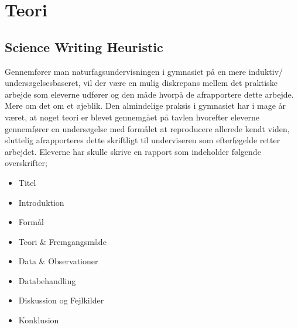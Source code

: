 \section{Teori}
\label{sec:2.5}

\subsection*{Science Writing Heuristic}
Gennemfører man naturfagsundervisningen i gymnasiet på en mere induktiv/ undersøgelsesbaseret, vil der være en mulig diskrepans mellem det praktiske arbejde som eleverne udfører og den måde hvorpå de afrapportere dette arbejde. Mere om det om et øjeblik. Den almindelige praksis i gymnasiet har i mage år været, at noget teori er blevet gennemgået på tavlen hvorefter eleverne gennemfører en undersøgelse med formålet at reproducere allerede kendt viden, sluttelig afrapporteres dette skriftligt til underviseren som efterføgelde retter arbejdet. Eleverne har skulle skrive en rapport som indeholder følgende overskrifter;
\begin{itemize}
	\item Titel\vspace{-15pt}
	\item Introduktion\vspace{-15pt}
	\item Formål\vspace{-15pt}
	\item Teori \& Fremgangsmåde\vspace{-15pt}
	\item Data \& Observationer\vspace{-15pt}
	\item Databehandling\vspace{-15pt}
	\item Diskussion og Fejlkilder\vspace{-15pt}
	\item Konklusion
\end{itemize}
